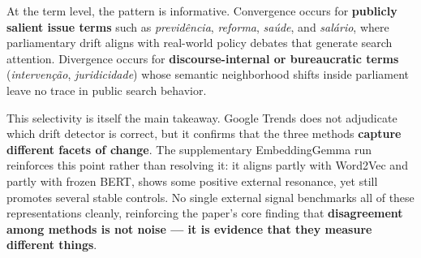\documentclass[12pt]{article}
\begin{document}
At the term level, the pattern is informative. Convergence occurs for
\textbf{publicly salient issue terms} such as \textit{previd\^encia},
\textit{reforma}, \textit{sa\'ude}, and \textit{sal\'ario}, where parliamentary
drift aligns with real-world policy debates that generate search attention.
Divergence occurs for \textbf{discourse-internal or bureaucratic terms}
(\textit{interven\c{c}\~ao}, \textit{juridicidade}) whose semantic
neighborhood shifts inside parliament leave no trace in public search behavior.

This selectivity is itself the main takeaway. Google Trends does not adjudicate
which drift detector is correct, but it confirms that the three methods
\textbf{capture different facets of change}. The supplementary EmbeddingGemma
run reinforces this point rather than resolving it: it aligns partly with
Word2Vec and partly with frozen BERT, shows some positive external resonance,
yet still promotes several stable controls. No single external signal
benchmarks all of these representations cleanly, reinforcing the paper's core
finding that \textbf{disagreement among methods is not noise --- it is
evidence that they measure different things}.



\end{document}
